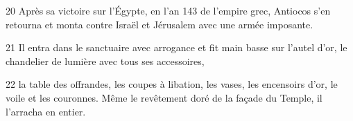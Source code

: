 
20 Après sa victoire sur l’Égypte, en l’an 143 de l’empire grec, Antiocos s’en retourna et monta contre Israël et Jérusalem avec une armée imposante.

21 Il entra dans le sanctuaire avec arrogance et fit main basse sur l’autel d’or, le chandelier de lumière avec tous ses accessoires,

22 la table des offrandes, les coupes à libation, les vases, les encensoirs d’or, le voile et les couronnes. Même le revêtement doré de la façade du Temple, il l’arracha en entier.

